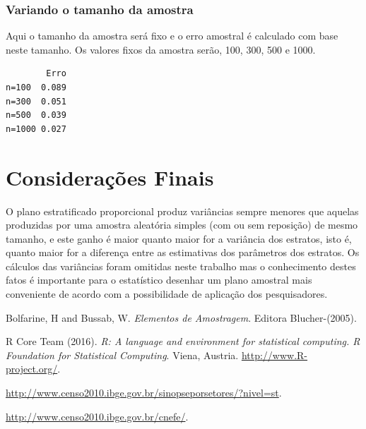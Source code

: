 \documentclass[12pt]{article}\usepackage[]{graphicx}\usepackage[]{color}
\makeatletter
\newenvironment{kframe}{%
 \def\at@end@of@kframe{}%
 \ifinner\ifhmode%
  \def\at@end@of@kframe{\end{minipage}}%
  \begin{minipage}{\columnwidth}%
 \fi\fi%
 \def\FrameCommand##1{\hskip\@totalleftmargin \hskip-\fboxsep
 \colorbox{shadecolor}{##1}\hskip-\fboxsep
     \hskip-\linewidth \hskip-\@totalleftmargin \hskip\columnwidth}%
 \MakeFramed {\advance\hsize-\width
   \@totalleftmargin\z@ \linewidth\hsize
   \@setminipage}}%
 {\par\unskip\endMakeFramed%
 \at@end@of@kframe}
\newenvironment{knitrout}{}{} %
\makeatother
\begin{document}
\subsubsection{Variando o tamanho da amostra}
\indent

Aqui o tamanho da amostra será fixo e o erro amostral
é calculado com base neste tamanho. Os valores fixos da amostra serão, 100, 300,
500 e 1000.\\

\begin{knitrout}\footnotesize
{}\color{fgcolor}\begin{kframe}
\begin{verbatim}
        Erro
n=100  0.089
n=300  0.051
n=500  0.039
n=1000 0.027
\end{verbatim}
\end{kframe}
\end{knitrout}

\section{Considerações Finais}
\indent

O plano estratificado proporcional produz variâncias sempre menores que aquelas
produzidas por uma amostra aleatória simples (com ou sem reposição) de mesmo
tamanho, e este ganho é maior quanto maior for a variância dos estratos, isto é,
quanto maior for a diferença entre as estimativas dos parâmetros dos estratos.
Os cálculos das variâncias foram omitidas neste trabalho mas o conhecimento
destes fatos é importante para o estatístico desenhar um plano amostral mais
conveniente de acordo com a possibilidade de aplicação dos pesquisadores.

\begin{thebibliography}{99}

 Bolfarine, H and Bussab, W.
\emph{Elementos de Amostragem}.
Editora Blucher-(2005).


 R Core Team (2016).
\emph{R: A language and environment for statistical computing. R Foundation for
  Statistical Computing}.
Viena, Austria. \url{http://www.R-project.org/}.

 \url{http://www.censo2010.ibge.gov.br/sinopseporsetores/?nivel=st}.

 \url{http://www.censo2010.ibge.gov.br/cnefe/}.

\end{thebibliography}
\end{document}
